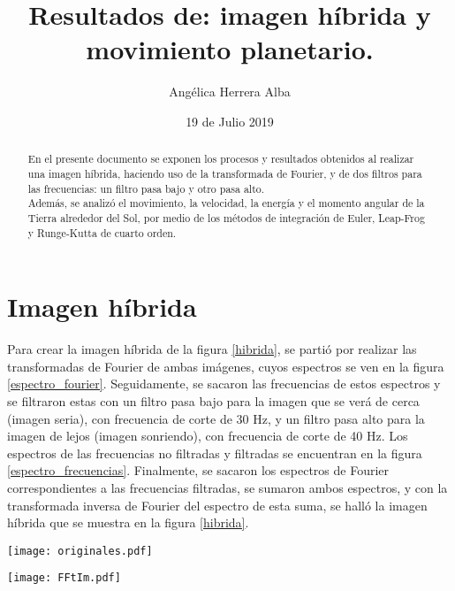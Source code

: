 \documentclass[preprint,12pt]{elsarticle}
\begin{document}
\begin{frontmatter}
\title{Resultados de: imagen híbrida y movimiento planetario.}

\author{Angélica Herrera Alba}
\address{Métodos computacionales}
\address{Universidad de Los Andes}
\date{19 de Julio 2019}

\begin{abstract}
En el presente documento se exponen los procesos y resultados obtenidos al realizar una imagen híbrida, haciendo uso de la transformada de Fourier, y de dos filtros para las frecuencias: un filtro pasa bajo y otro pasa alto.\\

Además, se analizó el movimiento, la velocidad, la energía y el momento angular de la Tierra alrededor del Sol, por medio de los métodos de integración de Euler, Leap-Frog y Runge-Kutta de cuarto orden. 
\end{abstract}
\end{frontmatter}

\section{Imagen híbrida}
Para crear la imagen híbrida de la figura \ref{hibrida}, se partió por realizar las transformadas de Fourier de ambas imágenes, cuyos espectros se ven en la figura \ref{espectro_fourier}. Seguidamente, se sacaron las frecuencias de estos espectros y se filtraron estas con un filtro pasa bajo para la imagen que se verá de cerca (imagen seria), con frecuencia de corte de 30 Hz, y un filtro pasa alto para la imagen de lejos (imagen sonriendo), con frecuencia de corte de 40 Hz. Los espectros de las frecuencias no filtradas y filtradas se encuentran en la figura \ref{espectro_frecuencias}. Finalmente, se sacaron los espectros de Fourier correspondientes a las frecuencias filtradas, se sumaron ambos espectros, y con la transformada inversa de Fourier del espectro de esta suma, se halló la imagen híbrida que se muestra en la figura \ref{hibrida}. 

\begin{figure*}[h!] 
\centering
\texttt{[image: originales.pdf]}
\caption{Imágenes originales.}
\label{originales.pdf}
\end{figure*}

\begin{figure*}[h!] 
\centering
\texttt{[image: FFtIm.pdf]}
\caption{Espectros de Fourier de ambas imágenes.}
\label{espectro_fourier}
\end{figure*}
\end{document}
